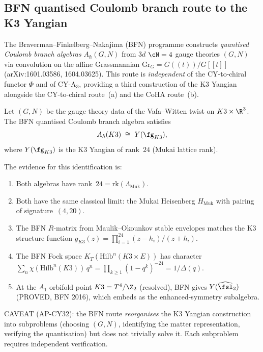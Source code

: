 
\subsection{BFN quantised Coulomb branch route to the K3 Yangian}
\label{subsec:bfn-coulomb-k3}

The Braverman--Finkelberg--Nakajima (BFN) programme constructs
\emph{quantised Coulomb branch algebras} $A_\hbar(G, N)$ from $3d$
$\cN = 4$ gauge theories $(G, N)$ via convolution on the affine
Grassmannian $\mathrm{Gr}_G = G(\!(t)\!)/G[\![t]\!]$
(arXiv:1601.03586, 1604.03625).  This route is \emph{independent} of
the CY-to-chiral functor $\Phi$ and of CY-A$_3$, providing a third
construction of the K3 Yangian alongside the CY-to-chiral route~(a) and
the CoHA route~(b).

\begin{conjecture}
\label{conj:bfn-k3-yangian}
\ClaimStatusConjectured\quad
{}%
Let $(G, N)$ be the gauge theory data of the Vafa--Witten twist
on $K3 \times \R^3$.  The BFN quantised Coulomb branch algebra satisfies
\[
  A_\hbar(K3) \;\cong\; Y(\fg_{K3}),
\]
where $Y(\fg_{K3})$ is the K3 Yangian of rank~$24$ (Mukai lattice rank).

The evidence for this identification is:
\begin{enumerate}[label=\textup{(\roman*)}]
  \item Both algebras have rank~$24 = \mathrm{rk}(\Lambda_{\mathrm{Muk}})$.
  \item Both have the same classical limit: the Mukai Heisenberg
    $H_{\mathrm{Muk}}$ with pairing of signature~$(4, 20)$.
  \item The BFN $R$-matrix from Maulik--Okounkov stable envelopes
    matches the K3 structure function
    $g_{K3}(z) = \prod_{i=1}^{24} (z - h_i)/(z + h_i)$.
  \item The BFN Fock space $K_T(\mathrm{Hilb}^n(K3 \times E))$ has
    character $\sum_n \chi(\mathrm{Hilb}^n(K3))\, q^n
    = \prod_{k \geq 1}(1 - q^k)^{-24} = 1/\Delta(q)$.
  \item At the $A_1$ orbifold point $K3 = T^4/\Z_2$
    \textup{(}resolved\textup{)}, BFN gives
    $Y(\widehat{\fsl}_2)$ \textup{(}PROVED, BFN 2016\textup{)},
    which embeds as the enhanced-symmetry subalgebra.
\end{enumerate}

CAVEAT \textup{(}AP-CY32\textup{)}: the BFN route
\emph{reorganises} the K3 Yangian construction into subproblems
\textup{(}choosing $(G, N)$, identifying the matter representation,
verifying the quantisation\textup{)} but does not trivially solve it.
Each subproblem requires independent verification.
\end{conjecture}

